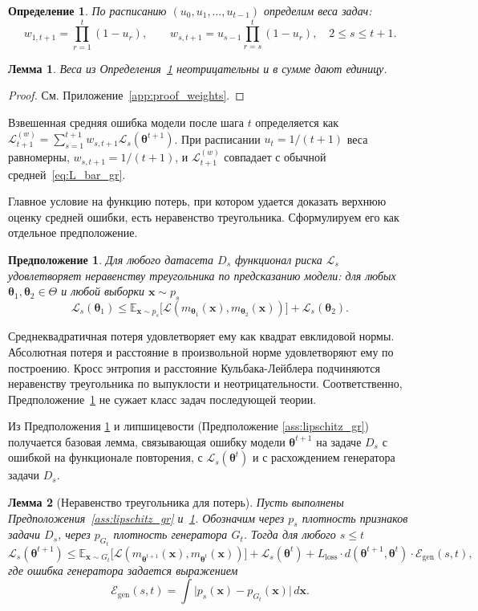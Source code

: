 \documentclass[a4paper,14pt,oneside,openany]{extarticle}
\newtheorem{lemma}{Лемма}
\newtheorem{definition}{Определение}
\newtheorem{assumption}{Предположение}
\newcommand{\bx}{\mathbf{x}}
\newcommand{\cL}{\mathcal{L}}
\newcommand{\cE}{\mathcal{E}}
\newcommand{\bbE}{\mathbb{E}}
\newcommand{\btheta}{\boldsymbol{\theta}}
\begin{document}
\begin{definition}\label{def:weights_gr}
    По расписанию $(u_0, u_1, \ldots, u_{t-1})$ определим веса задач:
    \[
        w_{1, t+1} = \prod_{r=1}^{t}(1 - u_r), \qquad w_{s, t+1} = u_{s-1}\prod_{r=s}^{t}(1 - u_r), \quad 2 \le s \le t+1.
    \]
\end{definition}

\begin{lemma}\label{lem:weights_gr}
    Веса из Определения~\ref{def:weights_gr} неотрицательны и в сумме дают единицу.
\end{lemma}

\begin{proof}См. Приложение~\ref{app:proof_weights}.\end{proof}

Взвешенная средняя ошибка модели после шага $t$ определяется как $\cL^{(w)}_{t+1} = \sum_{s=1}^{t+1} w_{s, t+1} \cL_s(\btheta^{t+1})$. При расписании $u_t = 1/(t+1)$ веса равномерны, $w_{s, t+1} = 1/(t+1)$, и $\cL^{(w)}_{t+1}$ совпадает с обычной средней~\eqref{eq:L_bar_gr}.

Главное условие на функцию потерь, при котором удается доказать верхнюю оценку средней ошибки, есть неравенство треугольника. Сформулируем его как отдельное предположение.

\begin{assumption}\label{ass:triangle_gr}
    Для любого датасета $D_s$ функционал риска $\cL_s$ удовлетворяет неравенству треугольника по предсказанию модели: для любых $\btheta_1, \btheta_2 \in \Theta$ и любой выборки $\bx \sim p_s$
    \[
        \cL_s(\btheta_1) \le \bbE_{\bx \sim p_s}\bigl[\cL(m_{\btheta_1}(\bx), m_{\btheta_2}(\bx))\bigr] + \cL_s(\btheta_2).
    \]
\end{assumption}

Среднеквадратичная потеря удовлетворяет ему как квадрат евклидовой нормы. Абсолютная потеря и расстояние в произвольной норме удовлетворяют ему по построению. Кросс энтропия и расстояние Кульбака-Лейблера подчиняются неравенству треугольника по выпуклости и неотрицательности. Соответственно, Предположение~\ref{ass:triangle_gr} не сужает класс задач последующей теории.

Из Предположения \ref{ass:triangle_gr} и липшицевости (Предположение \ref{ass:lipschitz_gr}) получается базовая лемма, связывающая ошибку модели $\btheta^{t+1}$ на задаче $D_s$ с ошибкой на функционале повторения, с $\cL_s(\btheta^t)$ и с расхождением генератора задачи $D_s$.

\begin{lemma}[Неравенство треугольника для потерь]\label{lem:triangle_gr}
    Пусть выполнены Предположения~\ref{ass:lipschitz_gr} и~\ref{ass:triangle_gr}. Обозначим через $p_s$ плотность признаков задачи $D_s$, через $p_{G_t}$ плотность генератора $G_t$. Тогда для любого $s \le t$
    \[
        \cL_s(\btheta^{t+1}) \le \bbE_{\bx \sim G_t}\bigl[\cL(m_{\btheta^{t+1}}(\bx), m_{\btheta^t}(\bx))\bigr] + \cL_s(\btheta^t) + L_{\text{loss}} \cdot d(\btheta^{t+1}, \btheta^t)\cdot \cE_{\mathrm{gen}}(s, t),
    \]
    где ошибка генератора задается выражением
    \[
        \cE_{\mathrm{gen}}(s, t) = \int \bigl|p_s(\bx) - p_{G_t}(\bx)\bigr|\, d\bx.
    \]
\end{lemma}
\end{document}
